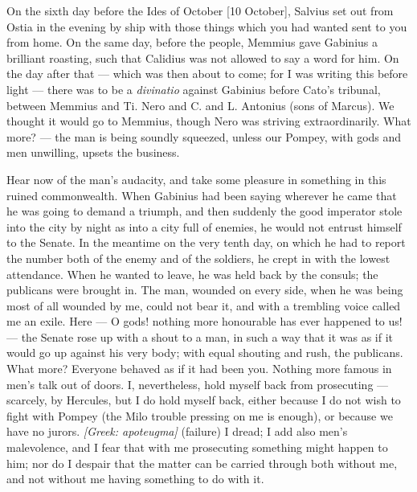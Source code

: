 

 On the sixth day before the Ides of October [10 October], Salvius set out from Ostia in the evening by ship with those things which you had wanted sent to you from home. On the same day, before the people, Memmius gave Gabinius a brilliant roasting, such that Calidius was not allowed to say a word for him. On the day after that --- which was then about to come; for I was writing this before light --- there was to be a \textit{divinatio} against Gabinius before Cato's tribunal, between Memmius and Ti. Nero and C. and L. Antonius (sons of Marcus). We thought it would go to Memmius, though Nero was striving extraordinarily. What more? --- the man is being soundly squeezed, unless our Pompey, with gods and men unwilling, upsets the business.

 Hear now of the man's audacity, and take some pleasure in something in this ruined commonwealth. When Gabinius had been saying wherever he came that he was going to demand a triumph, and then suddenly the good imperator stole into the city by night as into a city full of enemies, he would not entrust himself to the Senate. In the meantime on the very tenth day, on which he had to report the number both of the enemy and of the soldiers, he crept in with the lowest attendance. When he wanted to leave, he was held back by the consuls; the publicans were brought in. The man, wounded on every side, when he was being most of all wounded by me, could not bear it, and with a trembling voice called me an exile. Here --- O gods! nothing more honourable has ever happened to us! --- the Senate rose up with a shout to a man, in such a way that it was as if it would go up against his very body; with equal shouting and rush, the publicans. What more? Everyone behaved as if it had been you. Nothing more famous in men's talk out of doors. I, nevertheless, hold myself back from prosecuting --- scarcely, by Hercules, but I do hold myself back, either because I do not wish to fight with Pompey (the Milo trouble pressing on me is enough), or because we have no jurors. \textit{[Greek: apoteugma]} (failure) I dread; I add also men's malevolence, and I fear that with me prosecuting something might happen to him; nor do I despair that the matter can be carried through both without me, and not without me having something to do with it.

